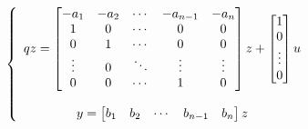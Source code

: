 \begin{equation}
    \left\{ \begin{array}{c}  
        qz = 
        \begin{bmatrix}
            -a_1 & -a_2 & \cdots & -a_{n-1} & -a_n \\
            1 & 0 & \cdots & 0 & 0 \\
            0 & 1 & \cdots & 0 & 0 \\
            \vdots & 0 & \ddots & \vdots & \vdots \\
            0 & 0 & \cdots & 1 & 0 \\
        \end{bmatrix} z + 
        \begin{bmatrix}
            1 \\ 0 \\ \vdots \\ 0 
        \end{bmatrix} u \\ \\
        y = 
        \begin{bmatrix}
            b_1 & b_2 & \cdots & b_{n-1} & b_n
        \end{bmatrix} z
      \end{array} \right.
\end{equation}
